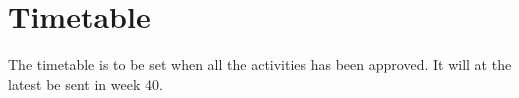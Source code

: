 \section{Timetable}
The timetable is to be set when all the activities has been approved. It will at the latest be sent in week 40.